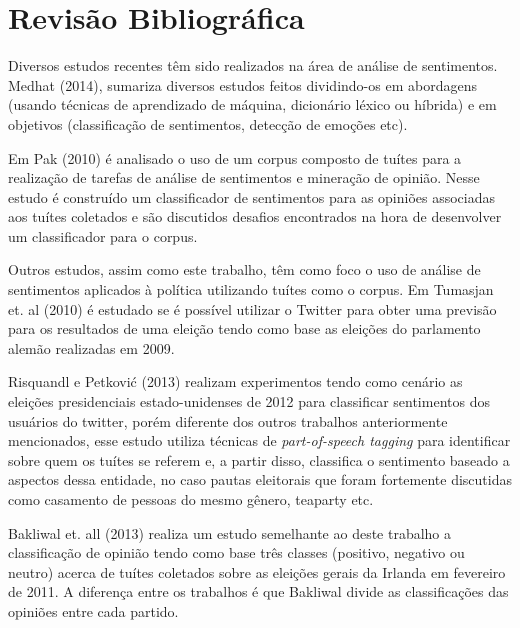 \chapter{Revisão Bibliográfica}

Diversos estudos recentes têm sido realizados na área de análise de sentimentos.
Medhat (2014)\citep{medhat2014}, sumariza diversos estudos feitos dividindo-os em
abordagens (usando técnicas de aprendizado de máquina, dicionário léxico ou
híbrida) e em objetivos (classificação de sentimentos, detecção de emoções etc).

Em Pak (2010)\citep{pak2010} é analisado o uso de um corpus composto de tuítes para
a realização de tarefas de análise de sentimentos e mineração de opinião. Nesse estudo
é construído um classificador de sentimentos para as opiniões associadas aos tuítes coletados
e são discutidos desafios encontrados na hora de desenvolver um classificador para o corpus.

Outros estudos, assim como este trabalho, têm como foco o uso de análise de sentimentos
aplicados à política utilizando tuítes como o corpus. Em Tumasjan et. al (2010)\citep{tumasjan2010} é estudado
se é possível utilizar o Twitter para obter uma previsão para os resultados de uma eleição
tendo como base as eleições do parlamento alemão realizadas em 2009.

Risquandl e Petković (2013)\citep{petkovic2013} realizam experimentos tendo como cenário as
eleições presidenciais estado-unidenses de 2012 para classificar sentimentos dos usuários do
twitter, porém diferente dos outros trabalhos anteriormente mencionados, esse estudo utiliza
técnicas de \textit{part-of-speech tagging} para identificar sobre quem os tuítes se referem e, a
partir disso, classifica o sentimento baseado a aspectos dessa entidade, no caso pautas eleitorais
que foram fortemente discutidas como casamento de pessoas do mesmo gênero, teaparty etc.

Bakliwal et. all (2013)\citep{bakliwal2013} realiza um estudo semelhante ao deste trabalho a classificação de opinião
tendo como base três classes (positivo, negativo ou neutro) acerca de tuítes coletados sobre
as eleições gerais da Irlanda em fevereiro de 2011. A diferença entre os trabalhos é que Bakliwal
divide as classificações das opiniões entre cada partido.


